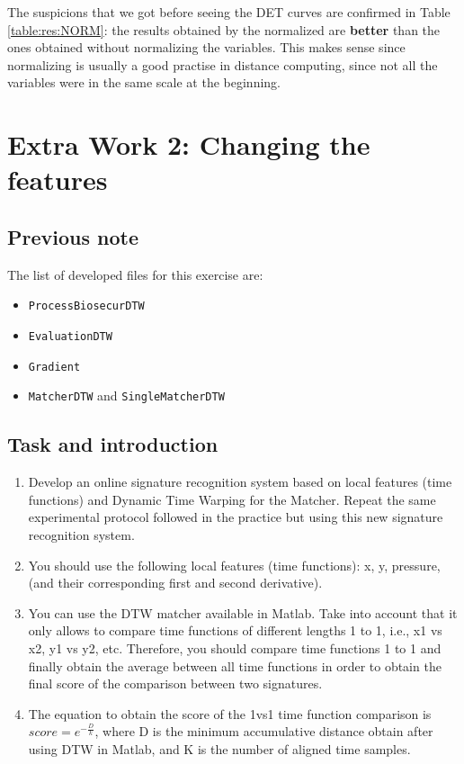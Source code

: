 \documentclass[a4paper]{article}
\def\inline{\lstinline[basicstyle=\ttfamily,keywordstyle={}]}
\begin{document}
{The suspicions that we got before seeing the DET curves are confirmed in Table \ref{table:res:NORM}: the results obtained by the normalized are \textbf{better} than the ones obtained without normalizing the variables. This makes sense since normalizing is usually a good practise in distance computing, since not all the variables were in the same scale at the beginning.\\


\section{Extra Work 2: Changing the features}

\subsection*{Previous note}
The list of developed files for this exercise are:

\begin{itemize}
\item \inline{ProcessBiosecurDTW}
\item \inline{EvaluationDTW}
\item \inline{Gradient}
\item \inline{MatcherDTW} and \inline{SingleMatcherDTW}
\end{itemize}

\subsection*{Task and introduction}
\begin{enumerate}
  \item 	Develop an online signature recognition system based on local features (time functions) and Dynamic Time Warping for the Matcher. Repeat the same experimental protocol followed in the practice but using this new signature recognition system.
  \item 	You should use the following local features (time functions): x, y, pressure, (and their corresponding first and second derivative).
  \item 	You can use the DTW matcher available in Matlab. Take into account that it only allows to compare time functions of different lengths 1 to 1, i.e., x1 vs x2, y1 vs y2, etc. Therefore, you should compare time functions 1 to 1 and finally obtain the average between all time functions in order to obtain the final score of the comparison between two signatures.
  \item 	The equation to obtain the score of the 1vs1 time function comparison is \(score=e^{-\frac{D}{k}}\), where D is the minimum accumulative distance obtain after using DTW in Matlab, and K is the number of aligned time samples.
\end{enumerate}

}
\end{document}
